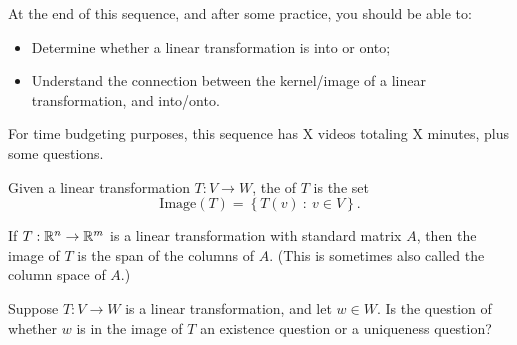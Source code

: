 







At the end of this sequence, and after some practice, you should be able to:

\begin{itemize}
\item Determine whether a linear transformation is into or onto;
\item Understand the connection between the kernel/image of a linear transformation, and into/onto.  
\end{itemize}


For time budgeting purposes, this sequence has X videos totaling X minutes, 
plus some questions.  




\endedxtext

\endedxvertical










\endedxvertical





{}  
Given a linear transformation $T: V\rightarrow W$, the  {} of $T$ is the set
\[ \mathrm{Image}(T) =  \left\{ T(v) \ : \ v \in V\right\}. \] 

{}  
If $T: \mathbb R^n \rightarrow \mathbb R^m$ is a linear transformation with standard matrix $A$, then the image of $T$
is the span of the columns of $A$.  (This is sometimes also called the column space of $A$.)  

\endedxtext






Suppose $T: V\rightarrow W$ is a linear transformation, and let $w\in W$.  Is the question 
of whether $w$ is in the image of $T$ an existence question or a uniqueness question?

